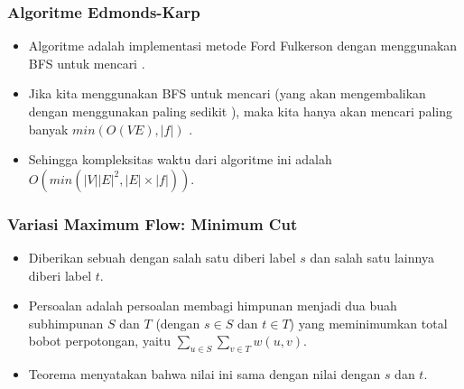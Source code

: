 \begin{frame}
\frametitle{Algoritme Edmonds-Karp}
\begin{itemize}
  \item Algoritme  adalah implementasi metode Ford Fulkerson dengan menggunakan BFS untuk mencari \faugmentingPath.
  \item Jika kita menggunakan BFS untuk mencari \faugmentingPath (yang akan mengembalikan \faugmentingPath dengan menggunakan paling sedikit \fedge), maka kita hanya akan mencari paling banyak $min(O(VE), |f|)$ \faugmentingPath.
  \item Sehingga kompleksitas waktu dari algoritme ini adalah $O(min(|V||E|^2, |E| \times |f|))$.
\end{itemize}
\end{frame}

\begin{frame}
\frametitle{Variasi Maximum Flow: Minimum Cut}
\begin{itemize}
  \item Diberikan sebuah \xspace dengan salah satu \fnode diberi label $s$ dan salah satu \fnode lainnya diberi label $t$.
  \item Persoalan  adalah persoalan membagi himpunan \fnode menjadi dua buah subhimpunan \fnode $S$ dan $T$ (dengan $s \in S$ dan $t \in T$) yang meminimumkan total bobot perpotongan, yaitu $\sum_{u \in S} \sum_{v \in T} w(u, v)$.
  \item Teorema  menyatakan bahwa nilai \fmincut ini sama dengan nilai \fmaxflow dengan \fsource $s$ dan \fsink $t$.
\end{itemize}
\end{frame}

